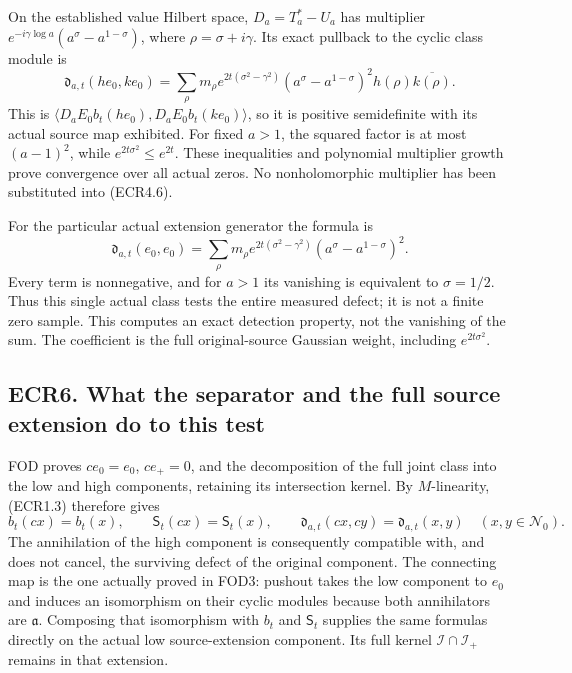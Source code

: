 On the established value Hilbert space, \(D_a=T_a^*-U_a\) has multiplier
\(e^{-i\gamma\log a}(a^\sigma-a^{1-\sigma})\), where
\(\rho=\sigma+i\gamma\). Its exact pullback to the cyclic class module
is \[
\mathfrak d_{a,t}(h e_0,k e_0)
=\sum_\rho m_\rho e^{2t(\sigma^2-\gamma^2)}
(a^\sigma-a^{1-\sigma})^2h(\rho)\overline{k(\rho)}.
\tag{ECR5.4}
\] This is \(\langle D_aE_0b_t(h e_0),D_aE_0b_t(k e_0)\rangle\), so it
is positive semidefinite with its actual source map exhibited. For fixed
\(a>1\), the squared factor is at most \((a-1)^2\), while
\(e^{2t\sigma^2}\le e^{2t}\). These inequalities and polynomial
multiplier growth prove convergence over all actual zeros. No
nonholomorphic multiplier has been substituted into (ECR4.6).

For the particular actual extension generator the formula is \[
\mathfrak d_{a,t}(e_0,e_0)
=\sum_\rho m_\rho e^{2t(\sigma^2-\gamma^2)}
(a^\sigma-a^{1-\sigma})^2.
\tag{ECR5.5}
\] Every term is nonnegative, and for \(a>1\) its vanishing is
equivalent to \(\sigma=1/2\). Thus this single actual class tests the
entire measured defect; it is not a finite zero sample. This computes an
exact detection property, not the vanishing of the sum. The coefficient
is the full original-source Gaussian weight, including
\(e^{2t\sigma^2}\).

\subsection{ECR6. What the separator and the full source extension do to
this
test}\label{ecr6.-what-the-separator-and-the-full-source-extension-do-to-this-test}

FOD proves \(c e_0=e_0\), \(c e_+=0\), and the decomposition of the full
joint class into the low and high components, retaining its intersection
kernel. By \(M\)-linearity, (ECR1.3) therefore gives \[
b_t(c x)=b_t(x),\qquad \mathsf S_t(c x)=\mathsf S_t(x),
\qquad
\mathfrak d_{a,t}(c x,c y)=\mathfrak d_{a,t}(x,y)
\quad(x,y\in\mathscr N_0).
\tag{ECR6.1}
\] The annihilation of the high component is consequently compatible
with, and does not cancel, the surviving defect of the original
component. The connecting map is the one actually proved in FOD3:
pushout takes the low component to \(e_0\) and induces an isomorphism on
their cyclic modules because both annihilators are \(\mathfrak a\).
Composing that isomorphism with \(b_t\) and \(\mathsf S_t\) supplies the
same formulas directly on the actual low source-extension component. Its
full kernel \(\mathcal I\cap\mathcal I_+\) remains in that extension.

